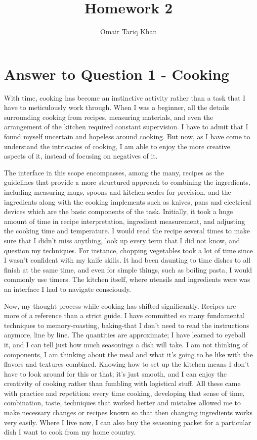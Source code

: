 \documentclass[
	letterpaper, %
]{jdf}
\author{Omair Tariq Khan}
\title{Homework 2}
\begin{document}

\maketitle
\hfill \break
\hfill \break


\section{Answer to Question 1 - Cooking}
With time, cooking has become an instinctive activity rather than a task that I have to meticulously work through. When I was a beginner, all the details surrounding cooking from recipes, measuring materials, and even the arrangement of the kitchen required constant supervision. I have to admit that I found myself uncertain and hopeless around cooking. But now, as I have come to understand the intricacies of cooking, I am able to enjoy the more creative aspects of it, instead of focusing on negatives of it.

The interface in this scope encompasses, among the many, recipes as the guidelines that provide a more structured approach to combining the ingredients, including measuring mugs, spoons and kitchen scales for precision, and the ingredients along with the cooking implements such as knives, pans and electrical devices which are the basic components of the task. Initially, it took a huge amount of time in recipe interpretation, ingredient measurement, and adjusting the cooking time and temperature. I would read the recipe several times to make sure that I didn't miss anything, look up every term that I did not know, and question my techniques. For instance, chopping vegetables took a lot of time since I wasn't confident with my knife skills. It had been daunting to time dishes to all finish at the same time, and even for simple things, such as boiling pasta, I would commonly use timers. The kitchen itself, where utensils and ingredients were was an interface I had to navigate consciously. 

Now, my thought process while cooking has shifted significantly. Recipes are more of a reference than a strict guide. I have committed so many fundamental techniques to memory-roasting, baking-that I don't need to read the instructions anymore, line by line. The quantities are approximate; I have learned to eyeball it, and I can tell just how much seasonings a dish will take. I am not thinking of components, I am thinking about the meal and what it's going to be like with the flavors and textures combined. Knowing how to set up the kitchen means I don't have to look around for this or that; it's just smooth, and I can enjoy the creativity of cooking rather than fumbling with logistical stuff. All these came with practice and repetition: every time cooking, developing that sense of time, combination, taste, techniques that worked better and mistakes allowed me to make necessary changes or recipes known so that then changing ingredients works very easily. Where I live now, I can also buy the seasoning packet for a particular dish I want to cook from my home country. 
\end{document}
